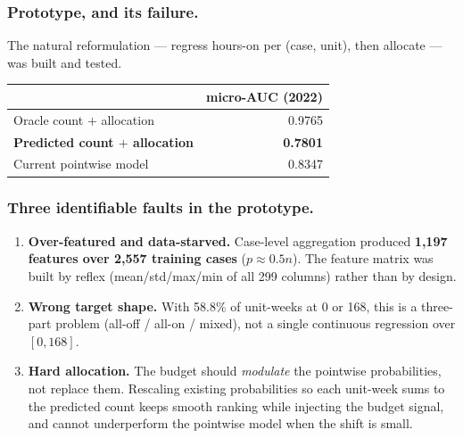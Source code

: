 
\subsubsection*{Prototype, and its failure.}
The natural reformulation --- regress hours-on per (case, unit), then allocate --- was built and
tested.

\begin{center}
\begin{tabular}{lr}
\toprule
 & micro-AUC (2022) \\
\midrule
Oracle count $+$ allocation      & 0.9765 \\
\textbf{Predicted count $+$ allocation} & \textbf{0.7801} \\
Current pointwise model          & 0.8347 \\
\bottomrule
\end{tabular}
\end{center}


\subsubsection*{Three identifiable faults in the prototype.}
\begin{enumerate}\itemsep1pt
  \item \textbf{Over-featured and data-starved.} Case-level aggregation produced
        \textbf{1{,}197 features over 2{,}557 training cases} ($p \approx 0.5n$). The feature
        matrix was built by reflex (mean/std/max/min of all 299 columns) rather than by design.
  \item \textbf{Wrong target shape.} With 58.8\% of unit-weeks at 0 or 168, this is a three-part
        problem (all-off / all-on / mixed), not a single continuous regression over $[0,168]$.
  \item \textbf{Hard allocation.} The budget should \emph{modulate} the pointwise probabilities,
        not replace them. Rescaling existing probabilities so each unit-week sums to the predicted
        count keeps smooth ranking while injecting the budget signal, and cannot underperform the
        pointwise model when the shift is small.
\end{enumerate}

